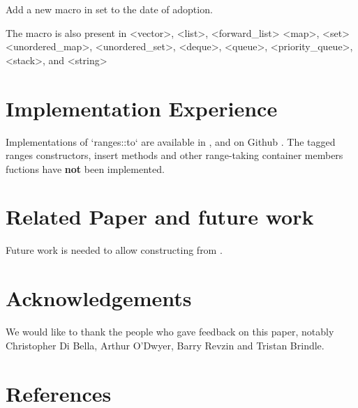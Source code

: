 \documentclass{wg21}
\begin{document}
Add a new macro in   set to the date of adoption.

The macro  is also present in
<vector>, <list>, <forward_list> <map>, <set> <unordered_map>, <unordered_set>, <deque>, <queue>, <priority_queue>, <stack>, and <string>


\section{Implementation Experience}

Implementations of `ranges::to` are available in \cite{Range V3}, \cite{cmcstl2} and on Github \cite{rangesnext}.
The tagged ranges constructors, insert methods and other range-taking container members fuctions have \textbf{not} been
implemented.

\section{Related Paper and future work}

Future work is needed to allow constructing  from .

\section{Acknowledgements}
We would like to thank the people who gave feedback on this paper, notably Christopher Di Bella, Arthur O'Dwyer, Barry Revzin
and Tristan Brindle.\\

\section{References}
\renewcommand{\section}[2]{}%

\end{document}
